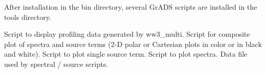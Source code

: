 After installation in the {\dir bin} directory, several GrADS scripts are
installed in the {\dir tools} directory.

\begin{flist}
      {Script to display profiling data generated by {\file
                       ww3\_multi}.} 
       {Script for composite plot of spectra and source
                       terms (2-D polar or Cartesian plots in color or in
                       black and white).}
      {Script to plot single source term.}
         {Script to plot spectra.}
   {Data file used by spectral / source scripts.}
\end{flist}



\pb

